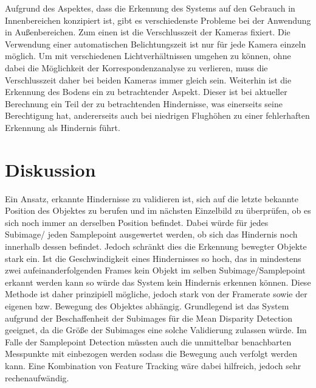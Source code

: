 \noindent
Aufgrund des Aspektes, dass die Erkennung des Systems auf den Gebrauch in Innenbereichen konzipiert ist, gibt es verschiedenste Probleme bei der Anwendung in Außenbereichen. Zum einen ist die Verschlusszeit der Kameras fixiert. Die Verwendung einer automatischen Belichtungszeit ist nur für jede Kamera einzeln möglich. Um mit verschiedenen Lichtverhältnissen umgehen zu können, ohne dabei die Möglichkeit der Korrespondenzanalyse zu verlieren, muss die Verschlusszeit daher bei beiden Kameras immer gleich sein. Weiterhin ist die Erkennung des Bodens ein zu betrachtender Aspekt. Dieser ist bei aktueller Berechnung ein Teil der zu betrachtenden Hindernisse, was einerseits seine Berechtigung hat, andererseits auch bei niedrigen Flughöhen zu einer fehlerhaften Erkennung als Hindernis führt.


\section{Diskussion}
\label{sec:conflict_discussion}
Ein Ansatz, erkannte Hindernisse zu validieren ist, sich auf die letzte bekannte Position des Objektes zu berufen und im nächsten Einzelbild zu überprüfen, ob es sich noch immer an derselben Position befindet. Dabei würde für jedes Subimage/ jeden Samplepoint ausgewertet werden, ob sich das Hindernis noch innerhalb dessen befindet. Jedoch schränkt dies die Erkennung bewegter Objekte stark ein. Ist die Geschwindigkeit eines Hindernisses so hoch, das in mindestens zwei aufeinanderfolgenden Frames kein Objekt im selben Subimage/Samplepoint erkannt werden kann so würde das System kein Hindernis erkennen können. Diese Methode ist daher prinzipiell mögliche, jedoch stark von der Framerate sowie der eigenen bzw. Bewegung des Objektes abhängig. Grundlegend ist das System aufgrund der Beschaffenheit der Subimages für die Mean Disparity Detection geeignet, da die Größe der Subimages eine solche Validierung zulassen würde. Im Falle der Samplepoint Detection müssten auch die unmittelbar benachbarten Messpunkte mit einbezogen werden sodass die Bewegung auch verfolgt werden kann. Eine Kombination von Feature Tracking wäre dabei hilfreich, jedoch sehr rechenaufwändig.\\

